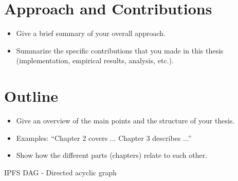 \section{Approach and Contributions}

\begin{itemize}
\item Give a brief summary of your overall approach.
\item Summarize the specific contributions that you made in this thesis (implementation, empirical results, analysis, etc.).
\end{itemize}


\section{Outline}

\begin{itemize}
\item Give an overview of the main points and the structure of your thesis.
\item Examples: ``Chapter 2 covers ...  Chapter 3 describes ...''
\item Show how the different parts (chapters) relate to each other.
\end{itemize}



IPFS DAG - Directed acyclic graph